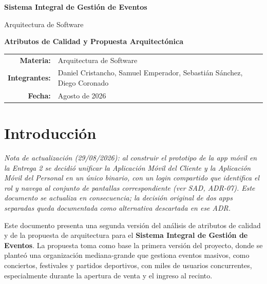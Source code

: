 \documentclass[12pt,a4paper]{article}
\begin{document}
\begin{titlepage}
\centering
\vspace*{2cm}
{\Huge\bfseries Sistema Integral de Gestión de Eventos\par}
\vspace{0.7cm}
{\Large Arquitectura de Software\par}
\vspace{1.2cm}
{\Large\bfseries Atributos de Calidad y Propuesta Arquitectónica\par}
\vspace{2cm}
\vfill
\begin{tabular}{rl}
\textbf{Materia:} & Arquitectura de Software\\
\textbf{Integrantes:} & Daniel Cristancho, Samuel Emperador, Sebastián Sánchez, Diego Coronado\\
\textbf{Fecha:} & Agosto de 2026
\end{tabular}
\end{titlepage}

\tableofcontents
\newpage

\section{Introducción}

\textit{Nota de actualización (29/08/2026): al construir el prototipo de la app móvil en la
Entrega 2 se decidió unificar la Aplicación Móvil del Cliente y la Aplicación Móvil del Personal en
un único binario, con un login compartido que identifica el rol y navega al conjunto de pantallas
correspondiente (ver SAD, ADR-07). Este documento se actualiza en consecuencia; la decisión original
de dos apps separadas queda documentada como alternativa descartada en ese ADR.}

Este documento presenta una segunda versión del análisis de atributos de calidad y de la propuesta de arquitectura para el \textbf{Sistema Integral de Gestión de Eventos}. La propuesta toma como base la primera versión del proyecto, donde se planteó una organización mediana-grande que gestiona eventos masivos, como conciertos, festivales y partidos deportivos, con miles de usuarios concurrentes, especialmente durante la apertura de venta y el ingreso al recinto.
\end{document}
